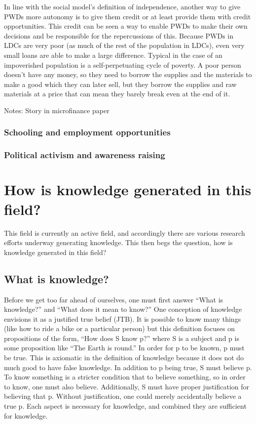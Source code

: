 \documentclass{lps}
\begin{document}
In line with the social model’s definition of independence, another way to
give PWDs more autonomy is to give them credit or at least provide them with
credit opportunities. This credit can be seen a way to enable PWDs to make
their own decisions and be responsible for the repercussions of this. Because
PWDs in LDCs are very poor (as much of the rest of the population in LDCs),
even very small loans are able to make a large difference. Typical in the case
of an impoverished population is a self-perpetuating cycle of poverty. A poor
person doesn’t have any money, so they need to borrow the supplies and the
materials to make a good which they can later sell, but they borrow the
supplies and raw materials at a price that can mean they barely break even at
the end of it.

Notes:
Story in microfinance paper 

\subsubsection{Schooling and employment opportunities}

\subsubsection{Political activism and awareness raising}

\section{How is knowledge generated in this field?}


This field is currently an active field, and accordingly there are various
research efforts underway generating knowledge. This then begs the question,
how is knowledge generated in this field?  \subsection{What is knowledge?}

Before we get too far ahead of ourselves, one must first answer “What is
knowledge?” and “What does it mean to know?” One conception of knowledge
envisions it as a justified true belief (JTB). It is possible to know many
things (like how to ride a bike or a particular person) but this definition
focuses on propositions of the form, “How does S know p?” where S is a subject
and p is some proposition like “The Earth is round.” In order for p to be
known, p must be true. This is axiomatic in the definition of knowledge
because it does not do much good to have false knowledge. In addition to p
being true, S must believe p. To know something is a stricter condition that
to believe something, so in order to know, one must also believe.
Additionally, S must have proper justification for believing that p. Without
justification, one could merely accidentally believe a true p. Each aspect is
necessary for knowledge, and combined they are sufficient for knowledge.
\end{document}

